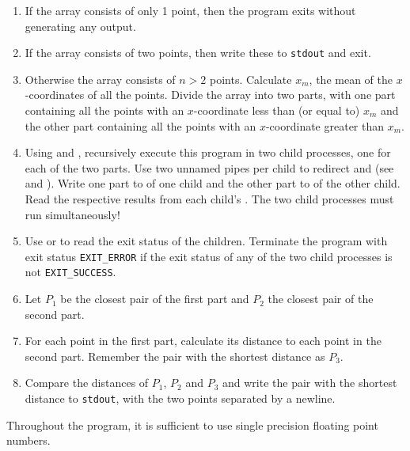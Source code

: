\begin{enumerate}
\item If the array consists of only 1 point, then the program exits without generating any output.

\item If the array consists of two points, then write these to \texttt{stdout} and exit.

\item Otherwise the array consists of $n>2$ points.
Calculate $x_m$, the mean of the $x$-coordinates of all the points.
Divide the array into two parts,
with one part containing all the points
with an $x$-coordinate less than (or equal to) $x_m$
and the other part containing all the points
with an $x$-coordinate greater than $x_m$.

\item Using  and ,
recursively execute this program in two child processes,
one for each of the two parts.
Use two unnamed pipes per child
to redirect  and 
(see  and ).
Write one part to  of one child
and the other part to  of the other child.
Read the respective results from each child's .
The two child processes must run simultaneously!

\item Use  or 
to read the exit status of the children.
Terminate the program with exit status \verb|EXIT_ERROR|
if the exit status of any of the two child processes is not \verb|EXIT_SUCCESS|.

\item Let $P_1$ be the closest pair of the first part and $P_2$ the closest pair of the second part.

\item For each point in the first part,
calculate its distance to each point in the second part.
Remember the pair with the shortest distance as $P_3$.

\item Compare the distances of $P_1$, $P_2$ and $P_3$
and write the pair with the shortest distance to \texttt{stdout},
with the two points separated by a newline.
\end{enumerate}

Throughout the program,
it is sufficient to use single precision floating point numbers.

\clearpage
